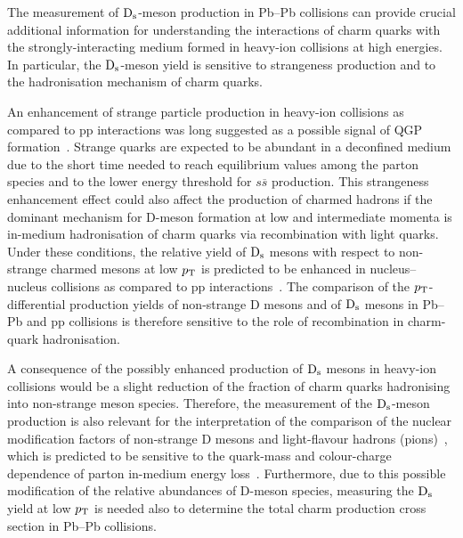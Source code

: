 The measurement of ${\rm D_s}$-meson production in Pb--Pb collisions can provide 
crucial additional information for understanding the 
interactions of charm quarks with the strongly-interacting 
medium formed in heavy-ion collisions at high energies.
In particular, the ${\rm D_s}$-meson yield is sensitive to strangeness production 
and to the hadronisation mechanism of charm quarks.

An enhancement of strange particle production in heavy-ion collisions as
compared to pp interactions was long suggested as a possible signal of QGP 
formation~\cite{RafelskiMuller,KochRafelski}.
Strange quarks are expected to be abundant in a deconfined medium due to 
the short time needed to reach equilibrium values among the parton species 
and to the lower energy threshold for $s\overline{s}$ production.
This strangeness enhancement effect could also affect the production of 
charmed hadrons if the dominant mechanism for D-meson formation at 
low and intermediate momenta is in-medium hadronisation of charm quarks via 
recombination with light quarks.
Under these conditions, the relative yield 
of ${\rm D_s}$ mesons with respect to non-strange charmed mesons at low $p_{\rm T}$ is predicted to be enhanced
in nucleus--nucleus collisions as compared to pp 
interactions~\cite{Andronic2003,RafelskiKuznetsova,HeFriesRapp}.
The comparison of the $p_{\rm T}$-differential production yields 
of non-strange D mesons and of ${\rm D_s}$ mesons in Pb--Pb and pp 
collisions is therefore sensitive to the role of recombination in charm-quark 
hadronisation.

A consequence of the possibly enhanced production of ${\rm D_s}$ mesons in heavy-ion 
collisions would be a slight reduction of the fraction of charm quarks 
hadronising into non-strange meson species.
Therefore, the measurement of the ${\rm D_s}$-meson production is also relevant
for the interpretation of the comparison of the nuclear modification
factors of non-strange D mesons and light-flavour 
hadrons (pions)~\cite{ALICEDRAA,Adam:2015sza}, which is predicted 
to be sensitive to the quark-mass and colour-charge dependence of parton 
in-medium energy loss~\cite{ADSW,WHDG,Djordjevic}.
Furthermore, due to this possible modification of the relative abundances
of D-meson species, measuring the ${\rm D_s}$ yield at low $p_{\rm T}$ is needed 
also to determine the total charm production cross section in Pb--Pb 
collisions.

